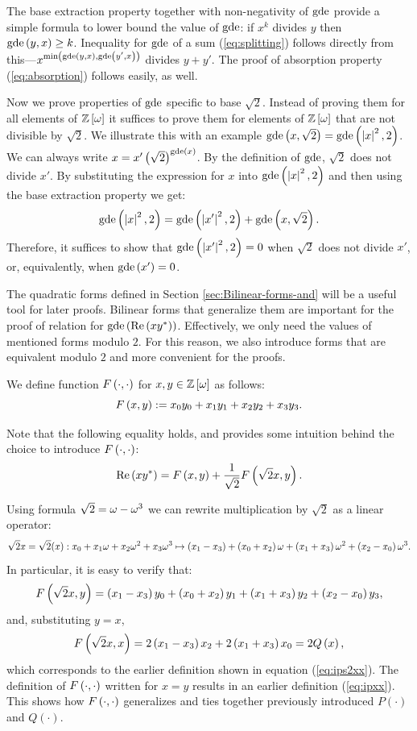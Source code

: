 \documentclass[english,journal]{extarticle}
\theoremstyle{plain}
\theoremstyle{plain}
\theoremstyle{plain}
\theoremstyle{definition}
\theoremstyle{plain}
\theoremstyle{plain}
\begin{document}
The base extraction property together with non-negativity
of $\mathbf{\mathrm{gde}}$ provide a simple formula to lower bound the value of $\mathbf{\mathrm{gde}}$: if $x^{k}$ divides
$y$ then $\mathbf{\mathrm{gde}}\left(y,x\right)\ge k$.  Inequality for $\mathbf{\mathrm{gde}}$ of a
sum (\ref{eq:splitting}) follows directly from this---$x^{\min\left(\mathbf{\mathrm{gde}}\left(y,x\right),\mathbf{\mathrm{gde}}\left(y',x\right)\right)}$
divides $y+y'$. The proof of absorption property (\ref{eq:absorption}) follows easily, as well. 

Now we prove properties of $\mathbf{\mathrm{gde}}$ specific to base $\sqrt{2}$. Instead
of proving them for all elements of $\mathbb{Z}\left[\omega\right]$ it suffices to prove
them for elements of $\mathbb{Z}\left[\omega\right]$ that are not divisible by $\sqrt{2}$. We illustrate
this with an example $\mathbf{\mathrm{gde}}\left(x,\sqrt{2}\right)=\mathbf{\mathrm{gde}}\left(\left|x\right|^{2},2\right)$.
We can always write $x=x'\left(\sqrt{2}\right)^{\mathbf{\mathrm{gde}}\left(x\right)}$.
By the definition of $\mathbf{\mathrm{gde}}$, $\sqrt{2}$ does not divide $x'$. By substituting
the expression for $x$ into $\mathbf{\mathrm{gde}}\left(\left|x\right|^{2},2\right)$ and then using the
base extraction property we get: 
\[
\mathbf{\mathrm{gde}}\left(\left|x\right|^{2},2\right)=\mathbf{\mathrm{gde}}\left(\left|x'\right|^{2},2\right)+\mathbf{\mathrm{gde}}\left(x,\sqrt{2}\right).
\]
Therefore, it suffices to show that $\mathbf{\mathrm{gde}}\left(\left|x'\right|^{2},2\right)=0$
when $\sqrt{2}$ does not divide $x'$, or, equivalently, when
$\mathbf{\mathrm{gde}}\left(x'\right)=0$. 

The quadratic forms defined in Section \ref{sec:Bilinear-forms-and} will
be a useful tool for later proofs. Bilinear forms that generalize
them are important for the proof of relation for
$\mathbf{\mathrm{gde}}\left(\mathrm{Re}\left(xy^{\ast}\right)\right)$.
Effectively, we only need the values of mentioned forms modulo $2$. For
this reason, we also introduce forms that are equivalent modulo $2$
and more convenient for the proofs. 

We define function $F\left( \cdot,\cdot\right)$ for $x,y\in\mathbb{Z}\left[\omega\right]$ as follows: 
\[
F\left( x,y\right):=x_{0}y_{0}+x_{1}y_{1}+x_{2}y_{2}+x_{3}y_{3}.
\]

Note that the following equality holds, and provides some intuition behind the choice to introduce $F\left( \cdot,\cdot\right)$:
\[
\mathrm{Re}\left(xy^{\ast}\right)=F\left( x,y\right)+\frac{1}{\sqrt{2}}F\left( \sqrt{2}x,y\right).
\]

Using formula $\sqrt{2}=\omega-\omega^{3}$ we can rewrite multiplication by $\sqrt{2}$
as a linear operator: 
\begin{equation}
\sqrt{2}x=\sqrt{2}(x): x_0+x_1\omega+x_2\omega^2+x_3\omega^3 \mapsto \left(x_{1}-x_{3}\right)+\left(x{}_{0}+x{}_{2}\right)\omega+\left(x{}_{1}
+x{}_{3}\right)\omega^{2}+\left(x_{2}-x_{0}\right)\omega^{3}\label{eq:sqrt2}.
\end{equation}
In particular, it is easy to verify that:  
\[
F\left( \sqrt{2}x,y\right)=\left(x{}_{1}-x{}_{3}\right)y_{0}+\left(x{}_{0}+x{}_{2}\right)y_
{1}+\left(x{}_{1}+x{}_{3}\right)y_{2}+\left(x_{2}-x_{0}\right)y_{3},
\]
and, substituting $y=x$, 
\[
F\left( \sqrt{2}x,x\right)=2\left(x_{1}-x_{3}\right)x_{2}+2\left(x{}_{1}+x{}_{3}\right)x_{0} = 2Q\left(x\right),
\]
which corresponds to the earlier definition shown in equation (\ref{eq:ips2xx}).  The definition of $F\left( \cdot,\cdot\right)$ written
for $x=y$ results in an earlier definition (\ref{eq:ipxx}).  This shows how $F\left( \cdot,\cdot\right)$ generalizes and ties together previously 
introduced $P(\cdot)$ and $Q(\cdot)$.
\end{document}
